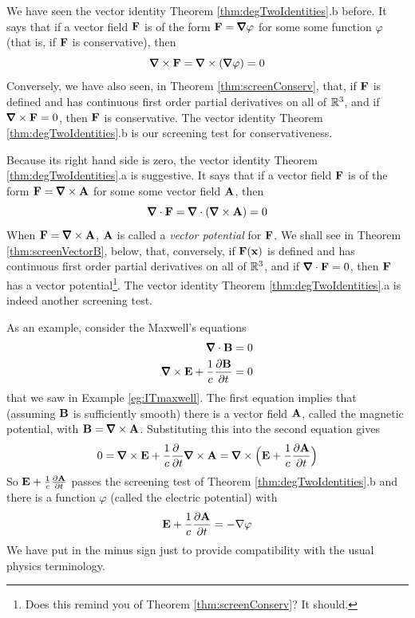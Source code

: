 \begin{eg}\label{eg:ITmawellB}
We have seen the vector identity Theorem \ref{thm:degTwoIdentities}.b
before. It says that if a vector
field $\mathbf{F}$ is of the form $\vF = \vnabla\varphi$ for some some function 
$\varphi$ (that is, if $\mathbf{F}$ is conservative), then
\begin{equation*}
\vnabla\times\vF = \vnabla\times(\vnabla\varphi) = 0
\end{equation*}
Conversely, we have also seen, in Theorem \ref{thm:screenConserv}, 
that, if $\mathbf{F}$ is defined and has continuous first order partial 
derivatives on all of $\mathbb{R}^3$, and if $\vnabla\times\vF=0$, then
$\mathbf{F}$ is conservative. The vector identity Theorem \ref{thm:degTwoIdentities}.b
is our screening test for conservativeness.

Because its right hand side is zero, the vector identity Theorem \ref{thm:degTwoIdentities}.a is suggestive. 
It says that if a vector field $\mathbf{F}$ is of the form 
$\vF = \vnabla\times\vA$ for some some vector field $\mathbf{A}$, then
\begin{equation*}
\vnabla\cdot\vF = \vnabla\cdot(\vnabla\times\vA) = 0
\end{equation*}
When $\vF = \vnabla\times\vA$, $\mathbf{A}$ is called a \emph{vector potential}
for $\mathbf{F}$. We shall see in Theorem \ref{thm:screenVectorB}, below,
that, conversely, if $\mathbf{F}(\mathbf{x})$ is defined and has continuous first 
order partial derivatives on all of $\mathbb{R}^3$, and if $\vnabla\cdot\vF=0$, 
then $\mathbf{F}$ has a vector potential\footnote{Does this remind you of 
Theorem \ref{thm:screenConserv}? It should.}. The vector identity 
Theorem \ref{thm:degTwoIdentities}.a is indeed another screening test.


As an example, consider the Maxwell's equations
\begin{align*}
\vnabla\cdot\vB &= 0 \\
\vnabla\times\vE +\frac{1}{c}\frac{\partial\vB}{\partial t}&=0 
\end{align*}
that we saw in Example \ref{eg:ITmaxwell}. The first equation implies
that (assuming $\mathbf{B}$ is sufficiently smooth) there is a 
vector field $\mathbf{A}$, called the magnetic potential, with 
$\vB=\vnabla\times\vA$. Substituting this into the second equation 
gives
\begin{equation*}
0= \vnabla\times\vE +\frac{1}{c}\frac{\partial\ }{\partial t}\vnabla\times\vA
=\vnabla\times\Big(\vE+\frac{1}{c}\frac{\partial\vA }{\partial t}\Big)
\end{equation*}
So $\mathbf{E}+\frac{1}{c}\frac{\partial\mathbf{A} }{\partial t}$ passes the screening
test of Theorem \ref{thm:degTwoIdentities}.b and there is a function $\varphi$
(called the electric potential)  with 
\begin{equation*}
\mathbf{E}+\frac{1}{c}\frac{\partial\mathbf{A} }{\partial t} = -\nabla \varphi
\end{equation*}
We have put in the minus sign just to provide compatibility with the
usual physics terminology.
\end{eg}

